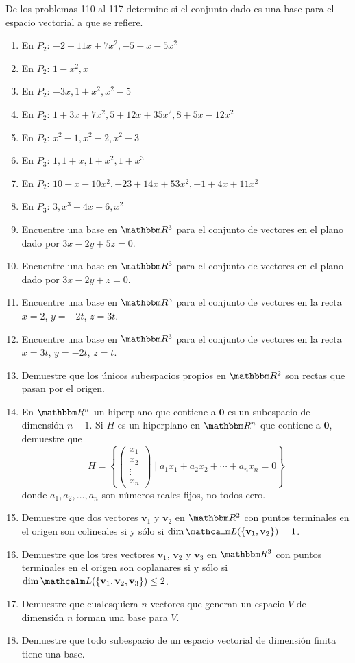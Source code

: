 De los problemas 110 al 117 determine si el conjunto dado es una base para el espacio vectorial a que se refiere.
\begin{enumerate}[resume]
    \item En $P_{2}$: $-2-11 x+7 x^{2},-5-x-5 x^{2}$
    \item En $P_{2}$: $1-x^{2}, x$
    \item En $P_{2}$: $-3 x, 1+x^{2}, x^{2}-5$
    \item En $P_{2}$: $1+3 x+7 x^{2}, 5+12 x+35 x^{2}, 8+5 x-12 x^{2}$
    \item En $P_{2}$: $x^{2}-1, x^{2}-2, x^{2}-3$
    \item En $P_{3}$: $1,1+x, 1+x^{2}, 1+x^{3}$
    \item En $P_{2}$: $10-x-10 x^{2},-23+14 x+53 x^{2},-1+4 x+11 x^{2}$
    \item En $P_{3}$: $3, x^{3}-4 x+6, x^{2}$
    \newpage
    \item Encuentre una base en $\RR[3]$ para el conjunto de vectores en el plano dado por $3 x-2 y+5 z=0$.
    \item Encuentre una base en $\RR[3]$ para el conjunto de vectores en el plano dado por $3 x-2 y+z=0$.
    \item Encuentre una base en $\RR[3]$ para el conjunto de vectores en la recta $x = 2$, $y = -2t$, $z = 3t$.
    \item Encuentre una base en $\RR[3]$ para el conjunto de vectores en la recta $x = 3t$, $y = -2t$, $z = t$.
    \item Demuestre que los únicos subespacios propios en $\RR[2]$ son rectas que pasan por el origen.
    \item En $\RR[n]$ un hiperplano que contiene a $\mathbf{0}$ es un subespacio de dimensión $n-1$. Si $H$ es un hiperplano en $\RR[n]$ que contiene a $\mathbf{0}$, demuestre que
    $$H=\left\{ \begin{pmatrix} x_1 \\ x_2 \\ \vdots \\ x_n \end{pmatrix} \mid a_{1} x_{1}+a_{2} x_{2}+\cdots+a_{n} x_{n}=0\right\}$$
    donde $a_{1}, a_{2}, \dots, a_{n}$ son números reales fijos, no todos cero.
    \item Demuestre que dos vectores $\mathbf{v}_1$ y $\mathbf{v}_2$ en $\RR[2]$ con puntos terminales en el origen son colineales si y sólo si $\Dim \Gen (\{\mathbf{v}_1, \mathbf{v}_2\}) = 1$.
    \item Demuestre que los tres vectores $\mathbf{v}_1$, $\mathbf{v}_2$ y $\mathbf{v}_3$ en $\RR[3]$ con puntos terminales en el origen son coplanares si y sólo si $\Dim \Gen (\{\mathbf{v}_1, \mathbf{v}_2, \mathbf{v}_3\}) \leq 2$.
    \item Demuestre que cualesquiera $n$ vectores que generan un espacio $V$ de dimensión $n$ forman una base para $V$.
    \item Demuestre que todo subespacio de un espacio vectorial de dimensión finita tiene una base.
\end{enumerate}